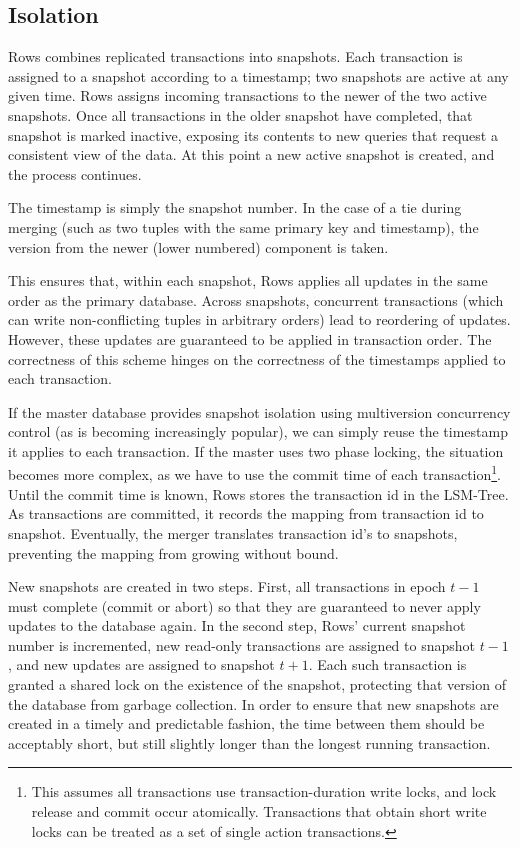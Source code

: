 \documentclass{sig-alternate-sigmod08}
\newcommand{\rows}{Rows\xspace}
\newcommand{\rowss}{Rows'\xspace}
\begin{document}
\subsection{Isolation}
\label{sec:isolation}
\rows combines replicated transactions into snapshots.  Each transaction
is assigned to a snapshot according to a timestamp; two snapshots are
active at any given time.  \rows assigns incoming transactions to the
newer of the two active snapshots.  Once all transactions in the older
snapshot have completed, that snapshot is marked inactive, exposing
its contents to new queries that request a consistent view of the
data.  At this point a new active snapshot is created, and the process
continues.

The timestamp is simply the snapshot number.  In the case of a tie
during merging (such as two tuples with the same primary key and
timestamp), the version from the newer (lower numbered) component is
taken.

This ensures that, within each snapshot, \rows applies all updates in the
same order as the primary database.  Across snapshots, concurrent
transactions (which can write non-conflicting tuples in arbitrary
orders) lead to reordering of updates.  However, these updates are
guaranteed to be applied in transaction order.  The correctness of
this scheme hinges on the correctness of the timestamps applied to
each transaction.

If the master database provides snapshot isolation using multiversion
concurrency control (as is becoming increasingly popular), we can
simply reuse the timestamp it applies to each transaction.  If the
master uses two phase locking, the situation becomes more complex, as
we have to use the commit time of each transaction\footnote{This assumes
  all transactions use transaction-duration write locks, and lock
  release and commit occur atomically.  Transactions that obtain short
  write locks can be treated as a set of single action transactions.}.
Until the commit time is known, \rows stores the transaction id in the
LSM-Tree.  As transactions are committed, it records the mapping from
transaction id to snapshot.  Eventually, the merger translates
transaction id's to snapshots, preventing the mapping from growing
without bound.

New snapshots are created in two steps.  First, all transactions in
epoch $t-1$ must complete (commit or abort) so that they are
guaranteed to never apply updates to the database again.  In the
second step, \rowss current snapshot number is incremented, new
read-only transactions are assigned to snapshot $t-1$, and new updates
are assigned to snapshot $t+1$.  Each such transaction is granted a
shared lock on the existence of the snapshot, protecting that version
of the database from garbage collection.  In order to ensure that new
snapshots are created in a timely and predictable fashion, the time
between them should be acceptably short, but still slightly longer
than the longest running transaction.
\end{document}
